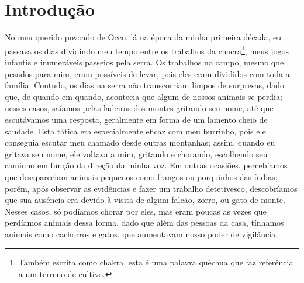 \cleardoublepage
\newpage
{}
\chapter*{Introdução} %

No meu querido povoado de Occo, lá na época da minha primeira década, eu passava os dias dividindo meu tempo entre os trabalhos da chacra\footnote{Também escrita como chakra, esta é uma palavra quéchua que faz referência a um terreno de cultivo.}, meus jogos infantis e inumeráveis passeios pela serra.
Os trabalhos no campo, mesmo que pesados para mim, eram possíveis de levar, pois eles eram divididos com toda a família.
Contudo, os dias na serra não transcorriam limpos de surpresas, dado que, de quando em quando, acontecia que algum de nossos animais se perdia; nesses casos, saíamos pelas ladeiras dos montes gritando seu nome, até que escutávamos uma resposta, geralmente em forma de um lamento cheio de saudade.
Esta tática era especialmente eficaz com meu burrinho, pois ele conseguia escutar meu chamado desde outras montanhas; assim, quando eu gritava seu nome, ele voltava a mim, gritando e chorando, escolhendo seu caminho em função da direção da minha voz.
Em outras ocasiões, percebíamos que desapareciam animais pequenos como frangos ou porquinhos das índias; porém, após observar as evidências e fazer um trabalho detetivesco, descobríamos que sua ausência era devido à visita de algum falcão, zorro, ou gato de monte.
Nesses casos, só podíamos chorar por eles, mas eram poucas as vezes que perdíamos animais dessa forma, dado que além das pessoas da casa, tínhamos animais como cachorros e gatos, que aumentavam nosso poder de vigilância.


